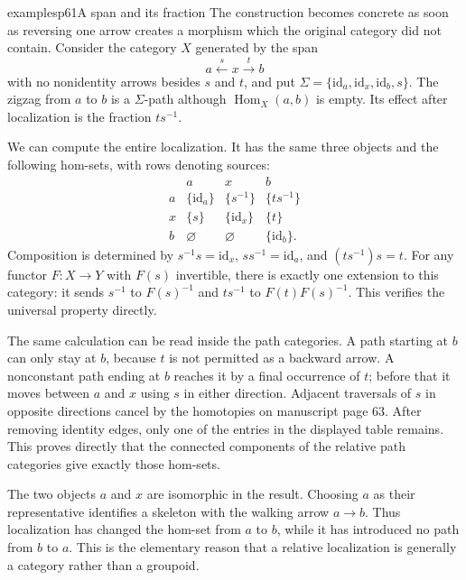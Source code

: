 \begin{dcomment}{examples}{p61}{A span and its fraction}
The construction becomes concrete as soon as reversing one arrow creates a morphism which the original category did not contain. Consider the category $X$ generated by the span
\[
 a\xleftarrow{s}x\xrightarrow{t}b
\]
with no nonidentity arrows besides $s$ and $t$, and put
$\Sigma=\{\mathrm{id}_a,\mathrm{id}_x,\mathrm{id}_b,s\}$. The zigzag from $a$ to $b$ is a $\Sigma$-path although $\operatorname{Hom}_X(a,b)$ is empty. Its effect after localization is the fraction $ts^{-1}$.

We can compute the entire localization. It has the same three objects and the following hom-sets, with rows denoting sources:
\[
\begin{array}{c|ccc}
 &a&x&b\\ \hline
 a&\{\mathrm{id}_a\}&\{s^{-1}\}&\{ts^{-1}\}\\
 x&\{s\}&\{\mathrm{id}_x\}&\{t\}\\
 b&\varnothing&\varnothing&\{\mathrm{id}_b\}.
\end{array}
\]
Composition is determined by $s^{-1}s=\mathrm{id}_x$,
$ss^{-1}=\mathrm{id}_a$, and $(ts^{-1})s=t$. For any functor $F:X\to Y$ with $F(s)$ invertible, there is exactly one extension to this category: it sends $s^{-1}$ to $F(s)^{-1}$ and $ts^{-1}$ to $F(t)F(s)^{-1}$. This verifies the universal property directly.

The same calculation can be read inside the path categories. A path starting at $b$ can only stay at $b$, because $t$ is not permitted as a backward arrow. A nonconstant path ending at $b$ reaches it by a final occurrence of $t$; before that it moves between $a$ and $x$ using $s$ in either direction. Adjacent traversals of $s$ in opposite directions cancel by the homotopies on manuscript page 63. After removing identity edges, only one of the entries in the displayed table remains. This proves directly that the connected components of the relative path categories give exactly those hom-sets.

The two objects $a$ and $x$ are isomorphic in the result. Choosing $a$ as their representative identifies a skeleton with the walking arrow $a\to b$. Thus localization has changed the hom-set from $a$ to $b$, while it has introduced no path from $b$ to $a$. This is the elementary reason that a relative localization is generally a category rather than a groupoid.
\end{dcomment}

